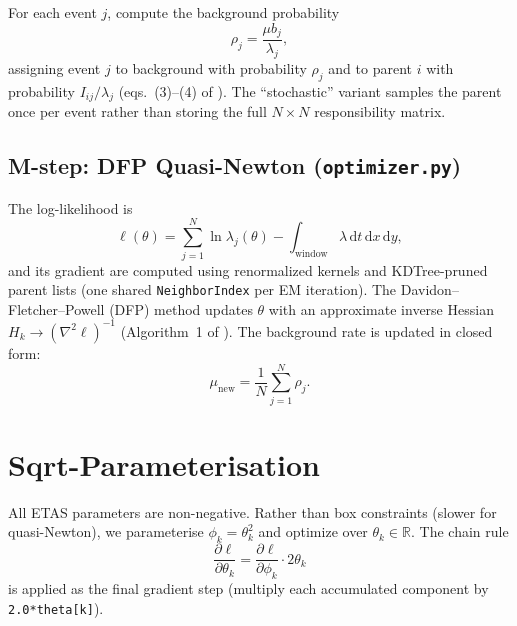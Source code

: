\documentclass[11pt,a4paper]{article}
\theoremstyle{plain}
\theoremstyle{definition}
\newcommand{\R}{\mathbb{R}}
\newcommand{\dd}{\mathrm{d}}
\begin{document}
For each event $j$, compute the background probability
\begin{equation}\label{eq:rho}
\rho_j = \frac{\mu b_j}{\lambda_j},
\end{equation}
assigning event $j$ to background with probability $\rho_j$ and to parent $i$
with probability $I_{ij}/\lambda_j$ (eqs.~(3)--(4) of \cite{J19}). The
``stochastic'' variant samples the parent once per event rather than storing
the full $N\times N$ responsibility matrix.

\subsection{M-step: DFP Quasi-Newton (\texttt{optimizer.py})}

The log-likelihood is
\begin{equation}\label{eq:loglik}
\ell(\theta) = \sum_{j=1}^{N}\ln\lambda_j(\theta)
              - \int_{\mathrm{window}}\lambda\,\dd t\,\dd x\,\dd y,
\end{equation}
and its gradient are computed using renormalized kernels and KDTree-pruned
parent lists (one shared \texttt{NeighborIndex} per EM iteration). The
Davidon--Fletcher--Powell (DFP) method updates $\theta$ with an approximate
inverse Hessian $H_k\to(\nabla^2\ell)^{-1}$ (Algorithm~1 of \cite{J19}).
The background rate is updated in closed form:
\begin{equation}\label{eq:mu-update}
\mu_{\mathrm{new}} = \frac{1}{N}\sum_{j=1}^{N}\rho_j.
\end{equation}

\section{Sqrt-Parameterisation}\label{sec:sqrt}

All ETAS parameters are non-negative. Rather than box constraints (slower for
quasi-Newton), we parameterise $\phi_k=\theta_k^2$ and optimize over
$\theta_k\in\R$. The chain rule
\begin{equation}\label{eq:chain}
\frac{\partial\ell}{\partial\theta_k}
= \frac{\partial\ell}{\partial\phi_k}\cdot 2\theta_k
\end{equation}
is applied as the final gradient step (multiply each accumulated component by
\texttt{2.0*theta[k]}).

\end{document}
